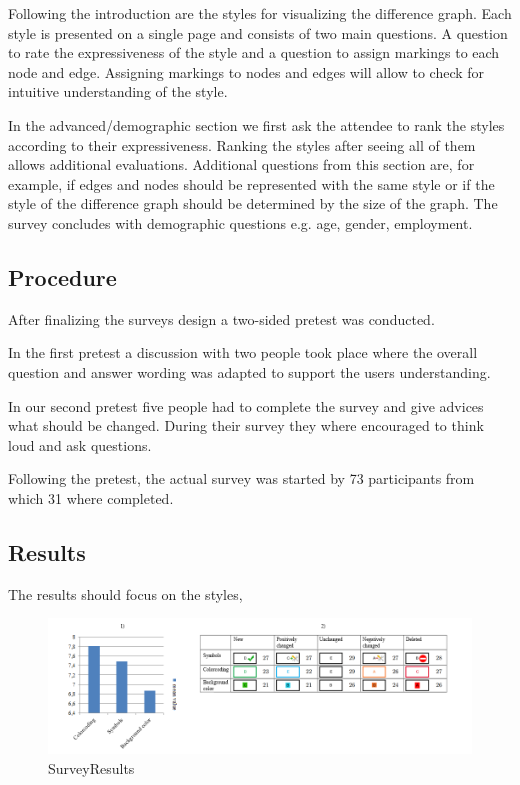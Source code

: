 \documentclass{llncs}
\begin{document}
Following the introduction are the styles for visualizing the difference graph. Each style is presented on a single page and consists of two main questions. A question to rate the expressiveness of the style and a question to assign markings to each node and edge. Assigning markings to nodes and edges will allow to check for intuitive understanding of the style.

In the advanced/demographic section we first ask the attendee to rank the styles according to their expressiveness. Ranking the styles after seeing all of them allows additional evaluations. Additional questions from this section are, for example, if edges and nodes should be represented with the same style or if the style of the difference graph should be determined by the size of the graph. The survey concludes with demographic questions e.g. age, gender, employment.


\subsection{Procedure} %
\label{sec:Procedure}
After finalizing the surveys design a two-sided pretest was conducted.

In the first pretest a discussion with two people took place where the overall question and answer wording was adapted to support the users understanding.

In our second pretest five people had to complete the survey and give advices what should be changed. During their survey they where encouraged to think loud and ask questions.  



Following the pretest, the actual survey was started by 73 participants from which 31 where completed.

\subsection{Results} %
\label{sec:Results}

The results should focus on the styles,



\begin{figure}
	\centering
	\includegraphics[width=1\textwidth]{Images/Results.PNG}
	\caption{SurveyResults}
	\label{fig:SurveyResults}
\end{figure}
\end{document}
